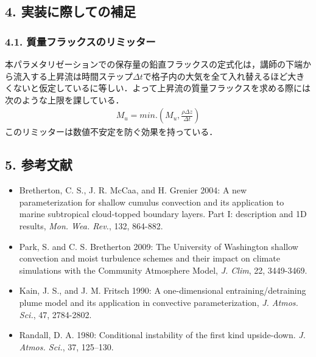 \hypertarget{ux5b9fux88c5ux306bux969bux3057ux3066ux306eux88dcux8db3}{%
\subsection{4.
実装に際しての補足}\label{ux5b9fux88c5ux306bux969bux3057ux3066ux306eux88dcux8db3}}

\hypertarget{ux8ceaux91cfux30d5ux30e9ux30c3ux30afux30b9ux306eux30eaux30dfux30c3ux30bfux30fc}{%
\subsubsection{\texorpdfstring{4.1.
質量フラックスのリミッター}{4.1.  質量フラックスのリミッター}}\label{ux8ceaux91cfux30d5ux30e9ux30c3ux30afux30b9ux306eux30eaux30dfux30c3ux30bfux30fc}}

本パラメタリゼーションでの保存量の鉛直フラックスの定式化は，講師の下端から流入する上昇流は時間ステップ\(\Delta t\)で格子内の大気を全て入れ替えるほど大きくないと仮定しているに等しい．よって上昇流の質量フラックスを求める際には次のような上限を課している．
\begin{eqnarray}M_u = min.\left(M_u, \frac{\rho\Delta z}{\Delta t}\right)\end{eqnarray}
このリミッターは数値不安定を防ぐ効果を持っている．

\hypertarget{ux53c2ux8003ux6587ux732e}{%
\subsection{5. 参考文献}\label{ux53c2ux8003ux6587ux732e}}

\begin{itemize}
\tightlist
\item
  Bretherton, C. S., J. R. McCaa, and H. Grenier 2004: A new
  parameterization for shallow cumulus convection and its application to
  marine subtropical cloud-topped boundary layers. Part I: description
  and 1D results, \emph{Mon. Wea. Rev.}, 132, 864-882.
\item
  Park, S. and C. S. Bretherton 2009: The University of Washington
  shallow convection and moist turbulence schemes and their impact on
  climate simulations with the Community Atmosphere Model, \emph{J.
  Clim}, 22, 3449-3469.
\item
  Kain, J. S., and J. M. Fritsch 1990: A one-dimensional
  entraining/detraining plume model and its application in convective
  parameterization, \emph{J. Atmos. Sci.}, 47, 2784-2802.
\item
  Randall, D. A. 1980: Conditional instability of the first kind
  upside-down. \emph{J. Atmos. Sci.}, 37, 125--130.
\end{itemize}
